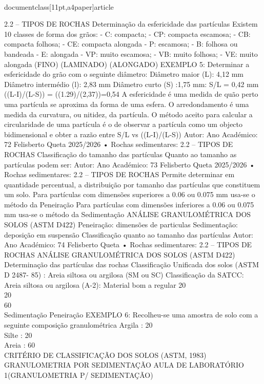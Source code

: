 \\documentclass[11pt,a4paper]{article}
\begin{document}
2.2 – TIPOS DE ROCHAS
Determinação da esfericidade das partículas  
Existem 10 classes de
forma dos grãos:
- C: compacta;
- CP: compacta escamosa;
- CB: compacta folhosa;
- CE: compacta alongada
- P: escamosa;
- B: folhosa ou bandeada
- E: alongada
- VP: muito escamosa;
- VB: muito folhosa;
- VE: muito alongada
(FINO) (LAMINADO) (ALONGADO)
EXEMPLO 5:
Determinar a 
esfericidade do grão 
com o seguinte 
diâmetro:
Diâmetro maior (L): 
4,12 mm
Diâmetro intermédio 
(l): 2,83 mm 
Diâmetro curto (S)
:1,75 mm:
S/L = 0,42 mm
((L-I)/(L-S)) = ((1.29)/(2,37))=0,54
A esfericidade é uma medida de quão perto
uma partícula se aproxima da forma de uma
esfera. O arredondamento é uma medida da
curvatura, ou nitidez, da partícula. O método
aceito para calcular a circularidade de uma
partícula é o de observar a partícula como um
objecto bidimensional e obter a razão entre
S/L vs ((L-I)/(L-S))
Autor:
Ano Académico:
72
Felisberto Queta
2025/2026
• Rochas sedimentares: 
2.2 – TIPOS DE ROCHAS
Classificação do tamanho das partículas
Quanto ao tamanho as partículas podem ser:
Autor:
Ano Académico:
73
Felisberto Queta
2025/2026
• Rochas sedimentares: 
2.2 – TIPOS DE ROCHAS
Permite determinar em quantidade percentual, a distribuição por tamanho das partículas que
constituem um solo.
Para partículas com dimensões superiores a 0.06 ou 0.075 mm usa-se o método da Peneiração
Para partículas com dimensões inferiores a 0.06 ou 0.075 mm usa-se o método da Sedimentação
ANÁLISE GRANULOMÉTRICA DOS SOLOS (ASTM D422)
Peneiração: dimensões de particulas Sedimentação: deposição em suspensão
Classificação quanto ao tamanho das partículas  
Autor:
Ano Académico:
74
Felisberto Queta
• Rochas sedimentares: 
2.2 – TIPOS DE ROCHAS
ANÁLISE GRANULOMÉTRICA DOS SOLOS (ASTM D422)
Determinação das partículas das rochas  
Classificação Unificada dos solos (ASTM D 2487- 85) : Areia siltosa ou argilosa (SM ou SC)
Classificação da SATCC: Areia siltosa ou argilosa (A-2): Material bom a regular
20\\%
20\\%
60\\%
Sedimentação Peneiração
EXEMPLO 6:
Recolheu-se uma amostra de 
solo com a seguinte 
composição granulométrica
Argila : 20\\%
Silte : 20\\%
Areia : 60\\%
CRITÉRIO DE CLASSIFICAÇÃO DOS SOLOS (ASTM, 1983)
GRANULOMETRIA POR SEDIMENTAÇÃO
AULA DE LABORATÓRIO 1(GRANULOMETRIA P/ 
SEDIMENTAÇÃO)\
\end{document}
